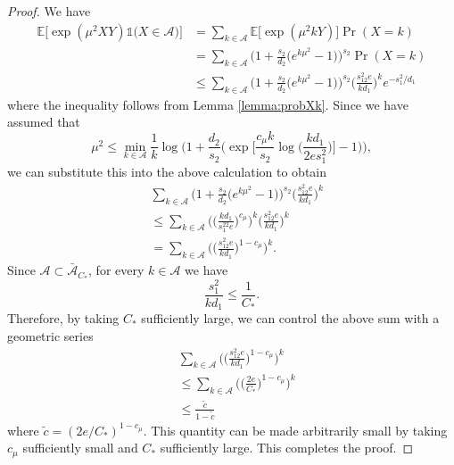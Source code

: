 \documentclass{article}
\newcommand{\cA}{\mathcal{A}}
\newcommand{\EE}{\mathbb{E}}
\newcommand{\one}{\mathds{1}}
\newcommand{\Ct}{C_{*}}
\theoremstyle{remark}
\begin{document}
\begin{proof}
    We have 
    \begin{align*}
        \EE\Big[\exp(\mu^2XY)\one\Big(X  \in \cA\Big)\Big] &= \sum_{k \in \cA}\EE\Big[\exp(\mu^2kY)\Big]\Pr(X = k) \\
        &= \sum_{k \in \cA}\Big(1 + \frac{s_2}{d_2}\big(e^{k\mu^2} - 1\big)\Big)^{s_2}\Pr(X = k) \\
        &\leq \sum_{k \in \cA}\Big(1 + \frac{s_2}{d_2}\big(e^{k\mu^2} - 1\big)\Big)^{s_2}\Big(\frac{s^2_12e}{kd_1}\Big)^ke^{-s_1^2/d_1}
    \end{align*}
    where the inequality follows from Lemma \ref{lemma:probXk}. Since we have assumed that
     \[\mu^2 \leq \min_{k \in \cA}\frac{1}{k}\log\Bigg(1 + \frac{d_2}{s_2}\bigg(\exp\Big[\frac{c_\mu k}{s_2}\log\big(\frac{kd_1}{2es_1^2}\big)\Big] - 1\bigg)\Bigg),\]
    we can substitute this into the above calculation to obtain
    \begin{align*}
        &\sum_{k \in \cA}\Big(1 + \frac{s_2}{d_2}\big(e^{k\mu^2} - 1\big)\Big)^{s_2}\Big(\frac{s^2_12e}{kd_1}\Big)^k \\ 
        &\leq \sum_{k \in \cA}\Bigg(\Big(\frac{kd_1}{s_1^22e}\Big)^{c_\mu}\Bigg)^k\Bigg(\frac{s^2_12e}{kd_1}\Bigg)^k \\ 
        &= \sum_{k \in \cA}\Bigg(\Big(\frac{s^2_12e}{kd_1}\Big)^{1-c_\mu}\Bigg)^k.
    \end{align*}
    Since $\cA \subset \bar{\cA}_{\Ct}$, for every $k \in \cA$ we have     
    $$\frac{s_1^2}{kd_1} \leq \frac{1}{\Ct}.$$
    Therefore, by taking $\Ct$ sufficiently large, we can control the above sum with a geometric series
    \begin{align*}
        &\sum_{k \in \cA}\Bigg(\Big(\frac{s^2_12e}{kd_1}\Big)^{1-c_\mu}\Bigg)^k \\
        &\leq \sum_{k \in \cA}\Bigg(\Big(\frac{2e}{\Ct}\Big)^{1-c_\mu}\Bigg)^k \\
        &\leq \frac{\tilde c}{1 - \tilde c}
    \end{align*}
    where $\tilde c = (2e/\Ct)^{1 - c_\mu}$. This quantity can be made arbitrarily small by taking $c_\mu$ sufficiently small and $\Ct$ sufficiently large. This completes the proof.
\end{proof}
\end{document}

